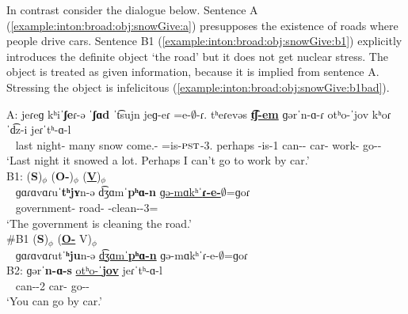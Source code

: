 In contrast consider the dialogue below. Sentence A (\ref{example:inton:broad:obj:snowGive:a}) presupposes the existence of roads where people drive cars. Sentence B1 (\ref{example:inton:broad:obj:snowGive:b1}) explicitly introduces the definite object `the road' but it does not get nuclear stress. The object is treated as given information, because it is implied from sentence A. Stressing the object is infelicitous (\ref{example:inton:broad:obj:snowGive:b1bad}). 

\begin{exe}
	\ex 
	\begin{xlist}
		
		\ex \gll  A: jeɾeɡ kʰiˈ\textbf{ʃe}ɾ-ə ˈ\textbf{ʃɑd} ˈt͡sujn jeɡ-eɾ  =e-$\emptyset$-ɾ. tʰeɾevəs \underline{\textbf{t͡ʃ-em}} ɡərˈn-ɑ-ɾ  otʰo-ˈjov kʰoɾˈd͡z-i jeɾˈtʰ-ɑ-l   \\
		~  last night-{} many snow come.{\aorother}-{\eptcp} =is-$\textsc{pst}$-3{\sg}. perhaps {\neggloss}-is-1{\sg} can-{\thgloss}-{\cn}  car-{\ins}  work-{\dat} go-{\thgloss}-{\infgloss} \\
		\trans `Last night it snowed a lot. Perhaps I can't go to work by car.' \label{example:inton:broad:obj:snowGive:a}
		\\ 
		\ex \glll B1:  (\textbf{S})$_\phi$ (\textbf{O-{}})$_\phi$ (\underline{\textbf{V}})$_\phi$\\
		~ ɡɑɾɑvɑɾuˈ\textbf{tʰjʏ}n-ə d͡ʒɑmˈ\textbf{pʰɑ-n} \underline{ɡə-mɑkʰˈ\textbf{ɾ-e-$\emptyset$}}=ɡoɾ \\ 
		~ government-{} road-{}   {\ind}-clean-{\thgloss}-3{\sg}={\prog} \\ 
		\trans `The government is cleaning the road.' \label{example:inton:broad:obj:snowGive:b1}
		\\  
		\ex \gll  \#B1  (\textbf{S})$_\phi$ ({\underline{\textbf{O-{}}}} V)$_\phi$\\ 
		~ ɡɑɾɑvɑɾutˈ\textbf{ʰju}n-ə \underline{d͡ʒɑmˈ\textbf{pʰɑ-n}} ɡə-mɑkʰˈɾ-e-$\emptyset$=ɡoɾ \\ \label{example:inton:broad:obj:snowGive:b1bad}
		\ex \gll B2:  ɡərˈ\textbf{n-ɑ-s} \underline{otʰo-ˈ\textbf{jov}} jeɾˈtʰ-ɑ-l \\
		~   can-{\thgloss}-2{\sg} car-{\ins} go-{\thgloss}-{\infgloss}\\
		\trans `You can go by car.'\
		\\ 
		
	\end{xlist}
	
\end{exe}

